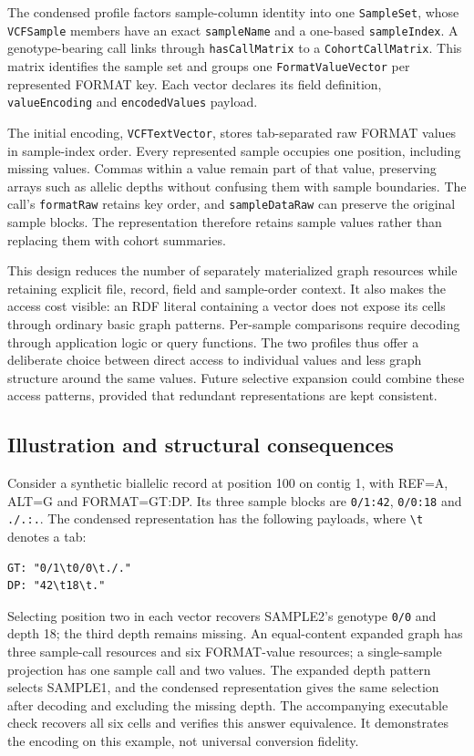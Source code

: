 \documentclass{ceurart}
\newcommand{\term}[1]{\texttt{#1}}
\begin{document}
The condensed profile factors sample-column identity into one \term{SampleSet}, whose \term{VCFSample} members have an exact \term{sampleName} and a one-based \term{sampleIndex}. A genotype-bearing call links through \term{hasCallMatrix} to a \term{CohortCallMatrix}. This matrix identifies the sample set and groups one \term{FormatValueVector} per represented FORMAT key. Each vector declares its field definition, \term{valueEncoding} and \term{encodedValues} payload.

The initial encoding, \term{VCFTextVector}, stores tab-separated raw FORMAT values in sample-index order. Every represented sample occupies one position, including missing values. Commas within a value remain part of that value, preserving arrays such as allelic depths without confusing them with sample boundaries. The call's \term{formatRaw} retains key order, and \term{sampleDataRaw} can preserve the original sample blocks. The representation therefore retains sample values rather than replacing them with cohort summaries.

This design reduces the number of separately materialized graph resources while retaining explicit file, record, field and sample-order context. It also makes the access cost visible: an RDF literal containing a vector does not expose its cells through ordinary basic graph patterns. Per-sample comparisons require decoding through application logic or query functions. The two profiles thus offer a deliberate choice between direct access to individual values and less graph structure around the same values. Future selective expansion could combine these access patterns, provided that redundant representations are kept consistent.

\subsection{Illustration and structural consequences}

Consider a synthetic biallelic record at position 100 on contig 1, with REF=A, ALT=G and FORMAT=GT:DP. Its three sample blocks are \term{0/1:42}, \term{0/0:18} and \term{./.:.}. The condensed representation has the following payloads, where \term{\textbackslash t} denotes a tab:

\begin{lstlisting}
GT: "0/1\t0/0\t./."
DP: "42\t18\t."
\end{lstlisting}

Selecting position two in each vector recovers SAMPLE2's genotype \term{0/0} and depth 18; the third depth remains missing. An equal-content expanded graph has three sample-call resources and six FORMAT-value resources; a single-sample projection has one sample call and two values. The expanded depth pattern selects SAMPLE1, and the condensed representation gives the same selection after decoding and excluding the missing depth. The accompanying executable check recovers all six cells and verifies this answer equivalence. It demonstrates the encoding on this example, not universal conversion fidelity.
\end{document}
